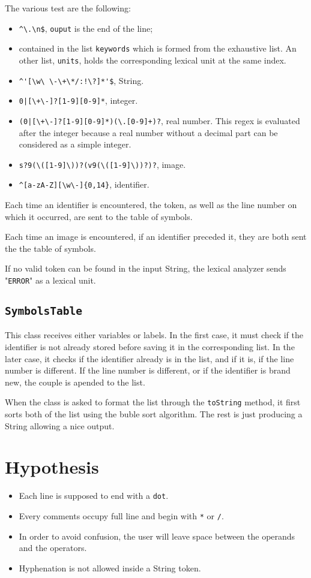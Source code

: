 \documentclass[a4paper,11pt]{article}
\begin{document}
The various test are the following:
\begin{itemize}
	\item \verb|^\.\n$|, \texttt{ouput} is the end of the line;
	\item contained in the list \texttt{keywords} which is formed from the exhaustive list.
		An other list, \texttt{units}, holds the corresponding lexical unit at the same index.
	\item \verb|^'[\w\ \-\+\*/:!\?]*'$|, String.
	\item \verb|0|\texttt{|}\verb|[\+\-]?[1-9][0-9]*|, integer.
	\item \verb|(0|\texttt{|}\verb|[\+\-]?[1-9][0-9]*)(\.[0-9]+)?|, real number. This regex is evaluated
		after the integer because a real number without a decimal part can be considered as a simple integer.
	\item \verb|s?9(\([1-9]\))?(v9(\([1-9]\))?)?|, image.
	\item \verb|^[a-zA-Z][\w\-]{0,14}|, identifier.
\end{itemize}

Each time an identifier is encountered, the token, as well as the line number on which it occurred,
are sent to the table of symbols.

Each time an image is encountered, if an identifier preceded it, they are both sent the the table of symbols.

If no valid token can be found in the input String, the lexical analyzer sends "\texttt{ERROR}" as a
lexical unit.


\subsection{\texttt{SymbolsTable}}
This class receives either variables or labels. In the first case, it must check if the identifier is
not already stored before saving it in the corresponding list. In the later case, it checks if the
identifier already is in the list, and if it is, if the line number is different. If the line number
is different, or if the identifier is brand new, the couple is apended to the list.

When the class is asked to format the list through the \texttt{toString} method, it first sorts both of the list
using the buble sort algorithm. The rest is just producing a String allowing a nice output.

\section{Hypothesis}
\begin{itemize}
	\item Each line is supposed to end with a \texttt{dot}.
	\item Every comments occupy full line and begin with \verb|*| or \texttt{/}.
	\item In order to avoid confusion, the user will leave space between the operands
		and the operators.
	\item Hyphenation is not allowed inside a String token.
\end{itemize}
\end{document}

